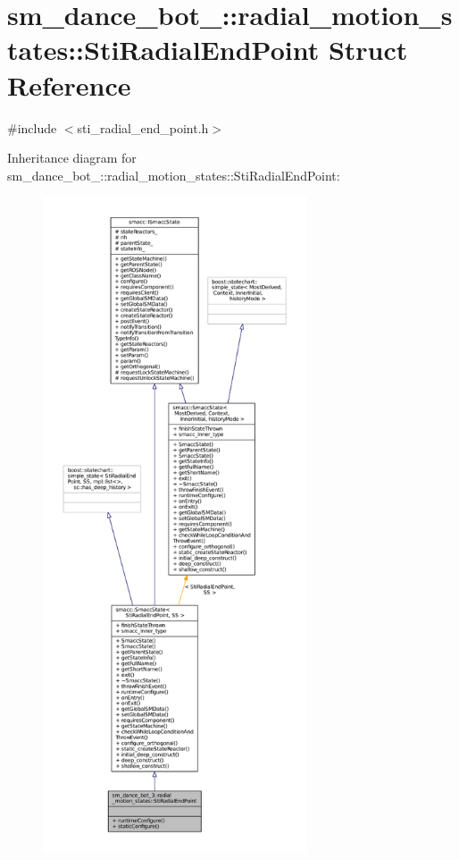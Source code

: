 \hypertarget{structsm__dance__bot__3_1_1radial__motion__states_1_1StiRadialEndPoint}{}\section{sm\+\_\+dance\+\_\+bot\+\_\+:\+:radial\+\_\+motion\+\_\+states\+:\+:Sti\+Radial\+End\+Point Struct Reference}
\label{structsm__dance__bot__3_1_1radial__motion__states_1_1StiRadialEndPoint}


{\ttfamily \#include $<$sti\+\_\+radial\+\_\+end\+\_\+point.\+h$>$}



Inheritance diagram for sm\+\_\+dance\+\_\+bot\+\_\+:\+:radial\+\_\+motion\+\_\+states\+:\+:Sti\+Radial\+End\+Point\+:
\nopagebreak
\begin{figure}[H]
\begin{center}
\leavevmode
\includegraphics[height=550pt]{structsm__dance__bot__3_1_1radial__motion__states_1_1StiRadialEndPoint__inherit__graph}
\end{center}
\end{figure}



